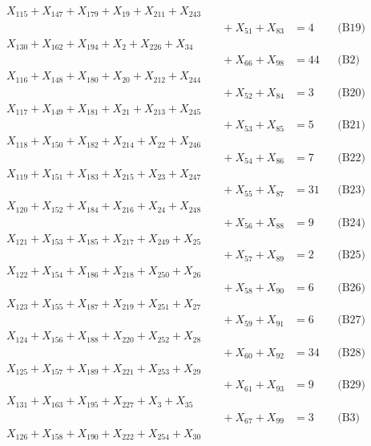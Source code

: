 \documentclass[a4paper,10pt]{article}
\begin{document}
{\begin{align}
X_{115} + X_{147} + X_{179} + X_{19} + X_{211} + X_{243} \\[0.5ex]
&\quad  + X_{51} + X_{83} &= 4 && \text{(B19)} \\
\allowbreak
X_{130} + X_{162} + X_{194} + X_{2} + X_{226} + X_{34} \\[0.5ex]
&\quad  + X_{66} + X_{98} &= 44 && \text{(B2)} \\
X_{116} + X_{148} + X_{180} + X_{20} + X_{212} + X_{244} \\[0.5ex]
&\quad  + X_{52} + X_{84} &= 3 && \text{(B20)} \\
X_{117} + X_{149} + X_{181} + X_{21} + X_{213} + X_{245} \\[0.5ex]
&\quad  + X_{53} + X_{85} &= 5 && \text{(B21)} \\
X_{118} + X_{150} + X_{182} + X_{214} + X_{22} + X_{246} \\[0.5ex]
&\quad  + X_{54} + X_{86} &= 7 && \text{(B22)} \\
X_{119} + X_{151} + X_{183} + X_{215} + X_{23} + X_{247} \\[0.5ex]
&\quad  + X_{55} + X_{87} &= 31 && \text{(B23)} \\
X_{120} + X_{152} + X_{184} + X_{216} + X_{24} + X_{248} \\[0.5ex]
&\quad  + X_{56} + X_{88} &= 9 && \text{(B24)} \\
X_{121} + X_{153} + X_{185} + X_{217} + X_{249} + X_{25} \\[0.5ex]
&\quad  + X_{57} + X_{89} &= 2 && \text{(B25)} \\
X_{122} + X_{154} + X_{186} + X_{218} + X_{250} + X_{26} \\[0.5ex]
&\quad  + X_{58} + X_{90} &= 6 && \text{(B26)} \\
X_{123} + X_{155} + X_{187} + X_{219} + X_{251} + X_{27} \\[0.5ex]
&\quad  + X_{59} + X_{91} &= 6 && \text{(B27)} \\
X_{124} + X_{156} + X_{188} + X_{220} + X_{252} + X_{28} \\[0.5ex]
&\quad  + X_{60} + X_{92} &= 34 && \text{(B28)} \\
X_{125} + X_{157} + X_{189} + X_{221} + X_{253} + X_{29} \\[0.5ex]
&\quad  + X_{61} + X_{93} &= 9 && \text{(B29)} \\
X_{131} + X_{163} + X_{195} + X_{227} + X_{3} + X_{35} \\[0.5ex]
&\quad  + X_{67} + X_{99} &= 3 && \text{(B3)} \\
X_{126} + X_{158} + X_{190} + X_{222} + X_{254} + X_{30} \\[0.5ex]

\end{align}}
\end{document}
